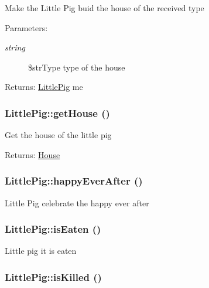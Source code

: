 Make the Little Pig buid the house of the received type

\begin{Desc}
\item[Parameters:]
\begin{description}
\item[{\em string}]\$strType type of the house \end{description}
\end{Desc}
\begin{Desc}
\item[Returns:]\hyperlink{class_little_pig}{LittlePig} me \end{Desc}
\hypertarget{class_little_pig_8c1c64b5dbf72b856e86326372437d14}{
\subsubsection[{getHouse}]{\setlength{\rightskip}{0pt plus 5cm}LittlePig::getHouse ()}}
\label{class_little_pig_8c1c64b5dbf72b856e86326372437d14}


Get the house of the little pig

\begin{Desc}
\item[Returns:]\hyperlink{class_house}{House} \end{Desc}
\hypertarget{class_little_pig_e312dbd0c7c7b3d61158f18242110619}{
\subsubsection[{happyEverAfter}]{\setlength{\rightskip}{0pt plus 5cm}LittlePig::happyEverAfter ()}}
\label{class_little_pig_e312dbd0c7c7b3d61158f18242110619}


Little Pig celebrate the happy ever after \hypertarget{class_little_pig_3c9b9848ad3cd1753ad2295a6bdbb4c4}{
\subsubsection[{isEaten}]{\setlength{\rightskip}{0pt plus 5cm}LittlePig::isEaten ()}}
\label{class_little_pig_3c9b9848ad3cd1753ad2295a6bdbb4c4}


Little pig it is eaten \hypertarget{class_little_pig_8c4d46e7f9edeec28cca1e60d7dcd6e6}{
\subsubsection[{isKilled}]{\setlength{\rightskip}{0pt plus 5cm}LittlePig::isKilled ()}}
\label{class_little_pig_8c4d46e7f9edeec28cca1e60d7dcd6e6}


